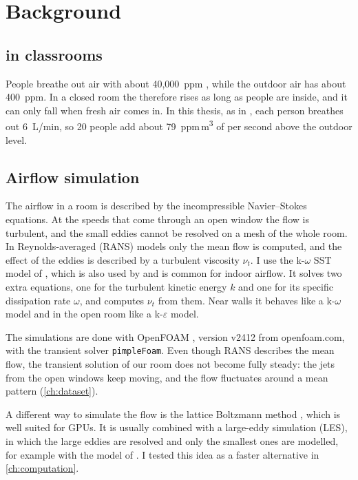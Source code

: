\chapter{Background}
\label{ch:background}

\section{\cotwo{} in classrooms}
People breathe out air with about 40,000~ppm \cotwo{}, while the outdoor air has about 400~ppm. In a closed
room the \cotwo{} therefore rises as long as people are inside, and it can only fall when fresh air comes
in. In this thesis, as in \citet{bian2025}, each person breathes out 6~L/min, so 20 people add about
79~ppm\,m\textsuperscript{3} of \cotwo{} per second above the outdoor level.

\section{Airflow simulation}
The airflow in a room is described by the incompressible Navier--Stokes equations. At the speeds that come
through an open window the flow is turbulent, and the small eddies cannot be resolved on a mesh of the
whole room. In Reynolds-averaged (RANS) models only the mean flow is computed, and the effect of the eddies
is described by a turbulent viscosity $\nu_t$. I use the k-$\omega$ SST model of \citet{menter1994}, which
is also used by \citet{bian2025} and is common for indoor airflow. It solves two extra equations, one for the
turbulent kinetic energy $k$ and one for its specific dissipation rate $\omega$, and computes $\nu_t$ from
them. Near walls it behaves like a k-$\omega$ model and in the open room like a k-$\varepsilon$ model.

The simulations are done with OpenFOAM \citep{weller1998}, version v2412 from openfoam.com, with the
transient solver \texttt{pimpleFoam}. Even though RANS describes the mean flow, the transient solution of
our room does not become fully steady: the jets from the open windows keep moving, and the flow fluctuates
around a mean pattern (\cref{ch:dataset}).

A different way to simulate the flow is the lattice Boltzmann method \citep{kruger2017}, which is well suited
for GPUs. It is usually combined with a large-eddy simulation (LES), in which the large eddies are resolved
and only the smallest ones are modelled, for example with the model of \citet{smagorinsky1963}. I tested this
idea as a faster alternative in \cref{ch:computation}.

